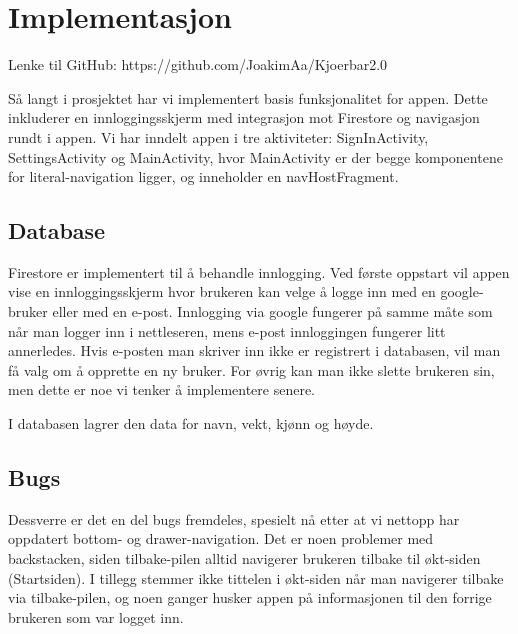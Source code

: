 \section{Implementasjon}
Lenke til GitHub: https://github.com/JoakimAa/Kjoerbar2.0

Så langt i prosjektet har vi implementert basis funksjonalitet for appen. Dette inkluderer en innloggingsskjerm med integrasjon mot Firestore og navigasjon rundt i appen. Vi har inndelt appen i tre aktiviteter: SignInActivity, SettingsActivity og MainActivity, hvor MainActivity er der begge komponentene for literal-navigation ligger, og inneholder en navHostFragment. 

\subsection{Database}
Firestore er implementert til å behandle innlogging. Ved første oppstart vil appen vise en innloggingsskjerm hvor brukeren kan velge å logge inn med en google-bruker eller med en e-post. Innlogging via google fungerer på samme måte som når man logger inn i nettleseren, mens e-post innloggingen fungerer litt annerledes. Hvis e-posten man skriver inn ikke er registrert i databasen, vil man få valg om å opprette en ny bruker. For øvrig kan man ikke slette brukeren sin, men dette er noe vi tenker å implementere senere.

I databasen lagrer den data for navn, vekt, kjønn og høyde.

\subsection{Bugs}
Dessverre er det en del bugs fremdeles, spesielt nå etter at vi nettopp har oppdatert bottom- og drawer-navigation. Det er noen problemer med backstacken, siden tilbake-pilen alltid navigerer brukeren tilbake til økt-siden (Startsiden). I tillegg stemmer ikke tittelen i økt-siden når man navigerer tilbake via tilbake-pilen, og noen ganger husker appen på informasjonen til den forrige brukeren som var logget inn.

